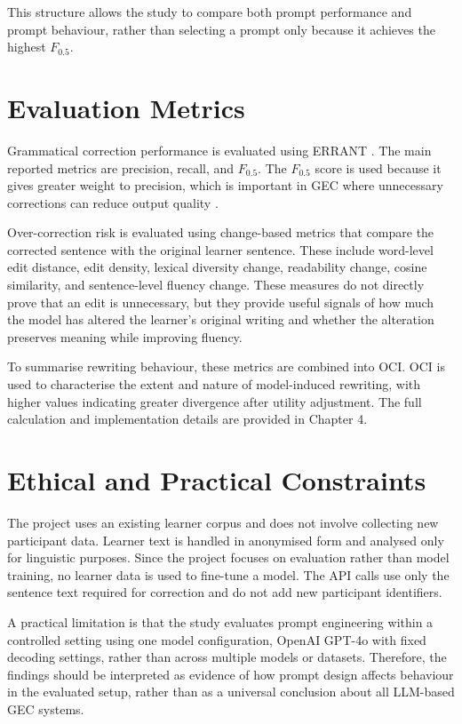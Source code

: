 This structure allows the study to compare both prompt performance and prompt behaviour, rather than selecting a prompt only because it achieves the highest $F_{0.5}$.

\section{Evaluation Metrics}

Grammatical correction performance is evaluated using ERRANT \cite{bryant-etal-2017-automatic}. The main reported metrics are precision, recall, and $F_{0.5}$. The $F_{0.5}$ score is used because it gives greater weight to precision, which is important in GEC where unnecessary corrections can reduce output quality \cite{ng-etal-2014-conll}.

Over-correction risk is evaluated using change-based metrics that compare the corrected sentence with the original learner sentence. These include word-level edit distance, edit density, lexical diversity change, readability change, cosine similarity, and sentence-level fluency change. These measures do not directly prove that an edit is unnecessary, but they provide useful signals of how much the model has altered the learner's original writing and whether the alteration preserves meaning while improving fluency.

To summarise rewriting behaviour, these metrics are combined into OCI. OCI is used to characterise the extent and nature of model-induced rewriting, with higher values indicating greater divergence after utility adjustment. The full calculation and implementation details are provided in Chapter 4.

\section{Ethical and Practical Constraints}

The project uses an existing learner corpus and does not involve collecting new participant data. Learner text is handled in anonymised form and analysed only for linguistic purposes. Since the project focuses on evaluation rather than model training, no learner data is used to fine-tune a model. The API calls use only the sentence text required for correction and do not add new participant identifiers.

A practical limitation is that the study evaluates prompt engineering within a controlled setting using one model configuration, OpenAI GPT-4o with fixed decoding settings, rather than across multiple models or datasets. Therefore, the findings should be interpreted as evidence of how prompt design affects behaviour in the evaluated setup, rather than as a universal conclusion about all LLM-based GEC systems.


